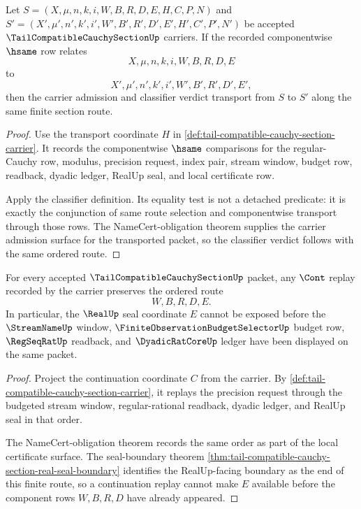 \begin{theorem}
\label{thm:tail-compatible-cauchy-section-classifier-transport}
Let $S=(X,\mu,n,k,i,W,B,R,D,E,H,C,P,N)$ and $S'=(X',\mu',n',k',i',W',B',R',D',E',H',C',P',N')$ be accepted $\TailCompatibleCauchySectionUp$ carriers. If the recorded componentwise $\hsame$ row relates
$$
X,\mu,n,k,i,W,B,R,D,E
$$
to
$$
X',\mu',n',k',i',W',B',R',D',E',
$$
then the carrier admission and classifier verdict transport from $S$ to $S'$ along the same finite section route.
\end{theorem}
\begin{proof}
Use the transport coordinate $H$ in \autoref{def:tail-compatible-cauchy-section-carrier}. It records the componentwise $\hsame$ comparisons for the regular-Cauchy row, modulus, precision request, index pair, stream window, budget row, readback, dyadic ledger, RealUp seal, and local certificate row.

Apply the classifier definition. Its equality test is not a detached predicate: it is exactly the conjunction of same route selection and componentwise transport through those rows. The NameCert-obligation theorem supplies the carrier admission surface for the transported packet, so the classifier verdict follows with the same ordered route.
\end{proof}

\begin{theorem}
\label{thm:tail-compatible-cauchy-section-continuation-replay}
For every accepted $\TailCompatibleCauchySectionUp$ packet, any $\Cont$ replay recorded by the carrier preserves the ordered route
$$
W,B,R,D,E.
$$
In particular, the $\RealUp$ seal coordinate $E$ cannot be exposed before the $\StreamNameUp$ window, $\FiniteObservationBudgetSelectorUp$ budget row, $\RegSeqRatUp$ readback, and $\DyadicRatCoreUp$ ledger have been displayed on the same packet.
\end{theorem}
\begin{proof}
Project the continuation coordinate $C$ from the carrier. By \autoref{def:tail-compatible-cauchy-section-carrier}, it replays the precision request through the budgeted stream window, regular-rational readback, dyadic ledger, and RealUp seal in that order.

The NameCert-obligation theorem records the same order as part of the local certificate surface. The seal-boundary theorem \autoref{thm:tail-compatible-cauchy-section-real-seal-boundary} identifies the RealUp-facing boundary as the end of this finite route, so a continuation replay cannot make $E$ available before the component rows $W,B,R,D$ have already appeared.
\end{proof}

